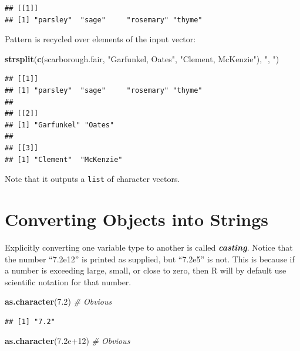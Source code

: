 \documentclass[
]{book}
\newenvironment{Shaded}{\begin{snugshade}}{\end{snugshade}}
\newcommand{\CommentTok}[1]{\textcolor[rgb]{0.56,0.35,0.01}{\textit{#1}}}
\newcommand{\FloatTok}[1]{\textcolor[rgb]{0.00,0.00,0.81}{#1}}
\newcommand{\KeywordTok}[1]{\textcolor[rgb]{0.13,0.29,0.53}{\textbf{#1}}}
\newcommand{\NormalTok}[1]{#1}
\newcommand{\StringTok}[1]{\textcolor[rgb]{0.31,0.60,0.02}{#1}}
\begin{document}
\begin{verbatim}
## [[1]]
## [1] "parsley"  "sage"     "rosemary" "thyme"
\end{verbatim}

Pattern is recycled over elements of the input vector:

\begin{Shaded}
\begin{Highlighting}[]
\KeywordTok{strsplit}\NormalTok{(}\KeywordTok{c}\NormalTok{(scarborough.fair,}
    \StringTok{"Garfunkel, Oates"}\NormalTok{,}
    \StringTok{"Clement, McKenzie"}\NormalTok{),}
    \StringTok{", "}\NormalTok{)}
\end{Highlighting}
\end{Shaded}

\begin{verbatim}
## [[1]]
## [1] "parsley"  "sage"     "rosemary" "thyme"   
## 
## [[2]]
## [1] "Garfunkel" "Oates"    
## 
## [[3]]
## [1] "Clement"  "McKenzie"
\end{verbatim}

Note that it outputs a \texttt{list} of character vectors.

\hypertarget{converting-objects-into-strings}{%
\section{Converting Objects into Strings}\label{converting-objects-into-strings}}

Explicitly converting one variable type to another is called \textbf{\emph{casting}}. Notice that the number ``7.2e12'' is printed as supplied, but ``7.2e5'' is not. This is because if a number is exceeding large, small, or close to zero, then R will by default use scientific notation for that number.

\begin{Shaded}
\begin{Highlighting}[]
\KeywordTok{as.character}\NormalTok{(}\FloatTok{7.2}\NormalTok{)  }\CommentTok{# Obvious}
\end{Highlighting}
\end{Shaded}

\begin{verbatim}
## [1] "7.2"
\end{verbatim}

\begin{Shaded}
\begin{Highlighting}[]
\KeywordTok{as.character}\NormalTok{(}\FloatTok{7.2e+12}\NormalTok{)  }\CommentTok{# Obvious}
\end{Highlighting}
\end{Shaded}
\end{document}
